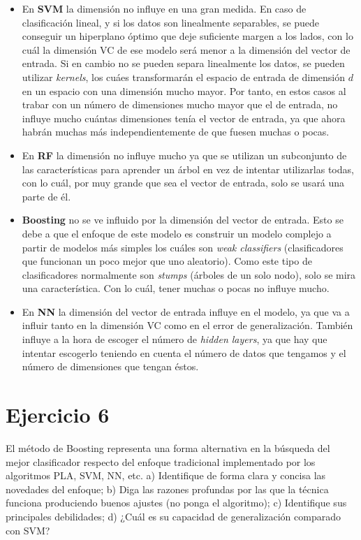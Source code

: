 \documentclass[11pt,a4paper]{article}
\newcommand{\addtoc}[1]{\addcontentsline{toc}{section}{#1}}
\begin{document}
\begin{itemize}[label=\textbullet]
	\item En \textbf{SVM} la dimensión no influye en una gran medida. En caso de clasificación lineal, y si los datos son linealmente
	separables, se puede conseguir un hiperplano óptimo que deje suficiente margen a los lados, con lo cuál la dimensión VC de ese
	modelo será menor a la dimensión del vector de entrada. Si en cambio no se pueden separa linealmente los datos, se pueden utilizar
	\textit{kernels}, los cuáes transformarán el espacio de entrada de dimensión $d$ en un espacio con una dimensión mucho mayor. Por
	tanto, en estos casos al trabar con un número de dimensiones mucho mayor que el de entrada, no influye mucho cuántas dimensiones
	tenía el vector de entrada, ya que ahora habrán muchas más independientemente de que fuesen muchas o pocas.
	\item En \textbf{RF} la dimensión no influye mucho ya que se utilizan un subconjunto de las características para aprender un
	árbol en vez de intentar utilizarlas todas, con lo cuál, por muy grande que sea el vector de entrada, solo se usará una parte
	de él.
	\item \textbf{Boosting} no se ve influido por la dimensión del vector de entrada. Esto se debe a que el enfoque de este modelo
	es construir un modelo complejo a partir de modelos más simples los cuáles son \textit{weak classifiers} (clasificadores que
	funcionan un poco mejor que uno aleatorio). Como este tipo de clasificadores normalmente son \textit{stumps} (árboles de un
	solo nodo), solo se mira una característica. Con lo cuál, tener muchas o pocas no influye mucho.
	\item En \textbf{NN} la dimensión del vector de entrada influye en el modelo, ya que va a influir tanto en la dimensión VC
	como en el error de generalización. También influye a la hora de escoger el número de \textit{hidden layers}, ya que hay que
	intentar escogerlo teniendo en cuenta el número de datos que tengamos y el número de dimensiones que tengan éstos.
\end{itemize}

\section*{Ejercicio 6}
\addtoc{Ejercicio 6}

\noindent El método de Boosting representa una forma alternativa en la búsqueda del mejor clasificador
respecto del enfoque tradicional implementado por los algoritmos PLA, SVM, NN, etc. a)
Identifique de forma clara y concisa las novedades del enfoque; b) Diga las razones profundas
por las que la técnica funciona produciendo buenos ajustes (no ponga el algoritmo); c)
Identifique sus principales debilidades; d) ¿Cuál es su capacidad de generalización comparado
con SVM?
\end{document}
